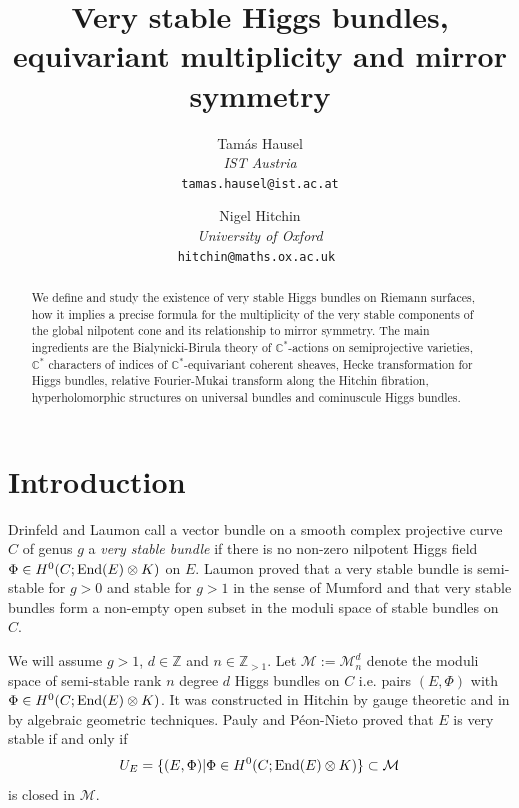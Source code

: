 \documentclass[12pt]{article}
\numberwithin{equation}{section}
\theoremstyle{remark}
\theoremstyle{definition}
\numberwithin{theorem}{section}
\def\beq{\begin{eqnarray}}
\def\eeq{\end{eqnarray}}
\def\C{\mathbb{C}}
\def\M{{\mathcal{M}}}
\def\Z{\mathbb{Z}}
\newcommand{\End}{\textnormal{End}}
\renewcommand{\1}{\mathbbm{1}}
\begin{document}

\title{Very stable Higgs bundles, equivariant multiplicity and mirror symmetry}

\author{ Tam\'as Hausel
\\ {\it IST Austria} 
\\{\tt tamas.hausel@ist.ac.at} \and Nigel Hitchin\\ {\it University of Oxford} 
\\{\tt hitchin@maths.ox.ac.uk }   }
\pagestyle{myheadings}

\maketitle

\begin{abstract} We define and study the existence of very stable Higgs bundles on Riemann surfaces, how it implies a precise formula for the  multiplicity of the very stable components of the global nilpotent cone and its relationship to mirror symmetry. The main ingredients are the Bialynicki-Birula theory of $\C^*$-actions on semiprojective varieties, $\C^*$ characters of indices of $\C^*$-equivariant coherent sheaves,   Hecke transformation for Higgs bundles, relative Fourier-Mukai transform along the Hitchin fibration, hyperholomorphic structures on universal bundles and cominuscule Higgs bundles. \end{abstract}

\tableofcontents


\section{Introduction}


Drinfeld \cite{drinfeld}  and Laumon \cite{laumon} call a vector bundle on a smooth complex projective curve $C$ of genus $g$ a {\em very stable bundle} if there is no non-zero nilpotent Higgs field $\Phi\in H^0(C;\End(E)\otimes K)$ on $E$. Laumon \cite[Proposition 3.5]{laumon} proved that a very stable bundle
is semi-stable for $g>0$ and stable for $g>1$ in the sense of Mumford and that very stable bundles form a non-empty open subset in the moduli space of stable bundles on $C$. %

We will assume $g>1$, $d\in \Z$ and $n\in \Z_{>1}$. Let $\M:=\M^d_n$ denote the moduli space of semi-stable rank $n$ degree $d$ Higgs bundles on $C$ i.e. pairs $(E,\Phi)$ with $\Phi\in H^0(C;\End(E)\otimes K)$. It was constructed in Hitchin \cite{hitchin1} by gauge theoretic and in \cite{ nitsure,simpson} by algebraic geometric techniques. Pauly and P\'eon-Nieto \cite{pauly-peon-nieto} proved that $E$ is very stable if and only if \beq \label{stableup}U_{E}=\{(E,\Phi)|\Phi\in H^0(C;\End(E)\otimes K)\} \subset \M\eeq is closed in $\M$. 
\end{document}
